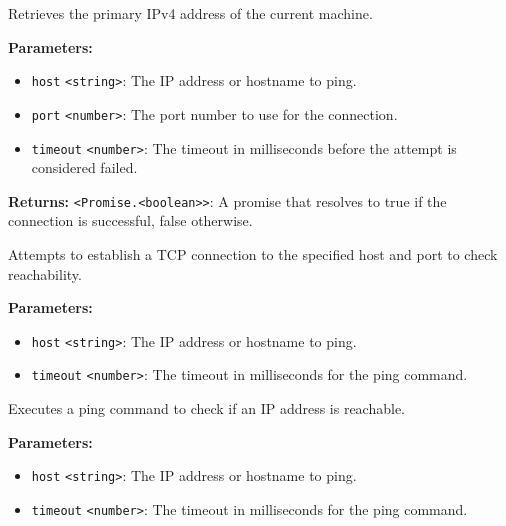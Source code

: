 \documentclass[12pt,a4paper]{article}
\begin{document}
\noindent Retrieves the primary IPv4 address of the current machine.

\vspace{5mm}
\noindent {}


\noindent \textbf{Parameters:}
\begin{itemize}
  \item \texttt{host} \texttt{<string>}: The IP address or hostname to ping.
  \item \texttt{port} \texttt{<number>}: The port number to use for the connection.
  \item \texttt{timeout} \texttt{<number>}: The timeout in milliseconds before the attempt is considered failed.
\end{itemize}

\noindent \textbf{Returns:} \texttt{<Promise.<boolean>>}: A promise that resolves to \textasciigrave{}true\textasciigrave{} if the connection is successful, \textasciigrave{}false\textasciigrave{} otherwise.

\noindent Attempts to establish a TCP connection to the specified host and port to check reachability.

\vspace{5mm}
\noindent {}


\noindent \textbf{Parameters:}
\begin{itemize}
  \item \texttt{host} \texttt{<string>}: The IP address or hostname to ping.
  \item \texttt{timeout} \texttt{<number>}: The timeout in milliseconds for the ping command.
\end{itemize}

\noindent Executes a ping command to check if an IP address is reachable.

\vspace{5mm}
\noindent {}


\noindent \textbf{Parameters:}
\begin{itemize}
  \item \texttt{host} \texttt{<string>}: The IP address or hostname to ping.
  \item \texttt{timeout} \texttt{<number>}: The timeout in milliseconds for the ping command.
\end{itemize}
\end{document}
